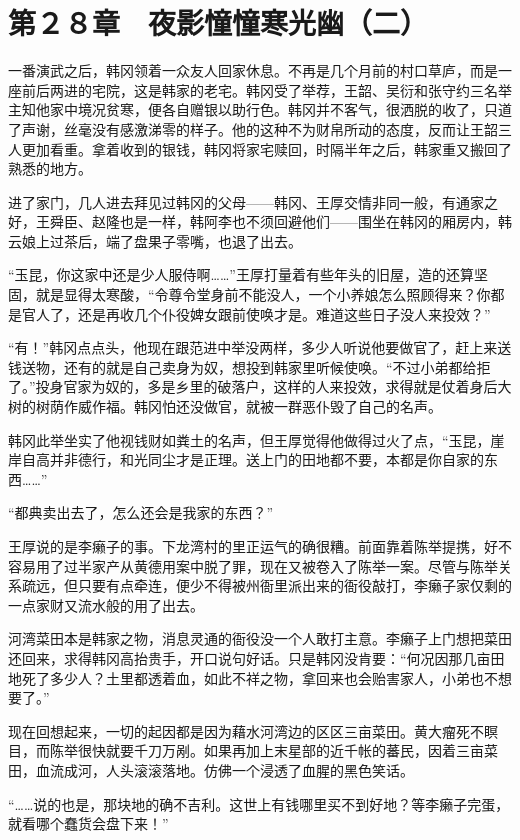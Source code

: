 \section{第２８章　夜影憧憧寒光幽（二）}

一番演武之后，韩冈领着一众友人回家休息。不再是几个月前的村口草庐，而是一座前后两进的宅院，这是韩家的老宅。韩冈受了举荐，王韶、吴衍和张守约三名举主知他家中境况贫寒，便各自赠银以助行色。韩冈并不客气，很洒脱的收了，只道了声谢，丝毫没有感激涕零的样子。他的这种不为财帛所动的态度，反而让王韶三人更加看重。拿着收到的银钱，韩冈将家宅赎回，时隔半年之后，韩家重又搬回了熟悉的地方。

进了家门，几人进去拜见过韩冈的父母——韩冈、王厚交情非同一般，有通家之好，王舜臣、赵隆也是一样，韩阿李也不须回避他们——围坐在韩冈的厢房内，韩云娘上过茶后，端了盘果子零嘴，也退了出去。

“玉昆，你这家中还是少人服侍啊……”王厚打量着有些年头的旧屋，造的还算坚固，就是显得太寒酸，“令尊令堂身前不能没人，一个小养娘怎么照顾得来？你都是官人了，还是再收几个仆役婢女跟前使唤才是。难道这些日子没人来投效？”

“有！”韩冈点点头，他现在跟范进中举没两样，多少人听说他要做官了，赶上来送钱送物，还有的就是自己卖身为奴，想投到韩家里听候使唤。“不过小弟都给拒了。”投身官家为奴的，多是乡里的破落户，这样的人来投效，求得就是仗着身后大树的树荫作威作福。韩冈怕还没做官，就被一群恶仆毁了自己的名声。

韩冈此举坐实了他视钱财如粪土的名声，但王厚觉得他做得过火了点，“玉昆，崖岸自高并非德行，和光同尘才是正理。送上门的田地都不要，本都是你自家的东西……”

“都典卖出去了，怎么还会是我家的东西？”

王厚说的是李癞子的事。下龙湾村的里正运气的确很糟。前面靠着陈举提携，好不容易用了过半家产从黄德用案中脱了罪，现在又被卷入了陈举一案。尽管与陈举关系疏远，但只要有点牵连，便少不得被州衙里派出来的衙役敲打，李癞子家仅剩的一点家财又流水般的用了出去。

河湾菜田本是韩家之物，消息灵通的衙役没一个人敢打主意。李癞子上门想把菜田还回来，求得韩冈高抬贵手，开口说句好话。只是韩冈没肯要：“何况因那几亩田地死了多少人？土里都透着血，如此不祥之物，拿回来也会贻害家人，小弟也不想要了。”

现在回想起来，一切的起因都是因为藉水河湾边的区区三亩菜田。黄大瘤死不瞑目，而陈举很快就要千刀万剐。如果再加上末星部的近千帐的蕃民，因着三亩菜田，血流成河，人头滚滚落地。仿佛一个浸透了血腥的黑色笑话。

“……说的也是，那块地的确不吉利。这世上有钱哪里买不到好地？等李癞子完蛋，就看哪个蠢货会盘下来！”

